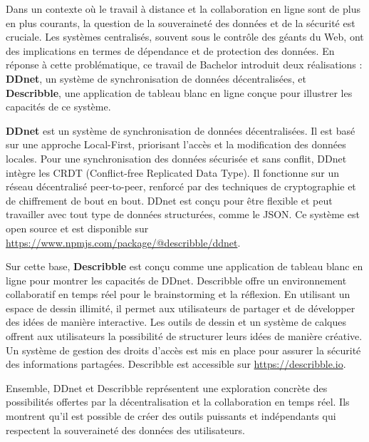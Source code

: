 Dans un contexte où le travail à distance et la collaboration en ligne sont de plus en plus courants, la question de la souveraineté des données et de la sécurité est cruciale. Les systèmes centralisés, souvent sous le contrôle des géants du Web, ont des implications en termes de dépendance et de protection des données. En réponse à cette problématique, ce travail de Bachelor introduit deux réalisations : \textbf{DDnet}, un système de synchronisation de données décentralisées, et \textbf{Describble}, une application de tableau blanc en ligne conçue pour illustrer les capacités de ce système.

\textbf{DDnet} est un système de synchronisation de données décentralisées. Il est basé sur une approche Local-First, priorisant l'accès et la modification des données locales. Pour une synchronisation des données sécurisée et sans conflit, DDnet intègre les CRDT (Conflict-free Replicated Data Type). Il fonctionne sur un réseau décentralisé peer-to-peer, renforcé par des techniques de cryptographie et de chiffrement de bout en bout. DDnet est conçu pour être flexible et peut travailler avec tout type de données structurées, comme le JSON. Ce système est open source et est disponible sur \url{https://www.npmjs.com/package/@describble/ddnet}.

\asterism

Sur cette base, \textbf{Describble} est conçu comme une application de tableau blanc en ligne pour montrer les capacités de DDnet. Describble offre un environnement collaboratif en temps réel pour le brainstorming et la réflexion. En utilisant un espace de dessin illimité, il permet aux utilisateurs de partager et de développer des idées de manière interactive. Les outils de dessin et un système de calques offrent aux utilisateurs la possibilité de structurer leurs idées de manière créative. Un système de gestion des droits d'accès est mis en place pour assurer la sécurité des informations partagées. Describble est accessible sur \url{https://describble.io}.

\asterism

Ensemble, DDnet et Describble représentent une exploration concrète des possibilités offertes par la décentralisation et la collaboration en temps réel. Ils montrent qu'il est possible de créer des outils puissants et indépendants qui respectent la souveraineté des données des utilisateurs.